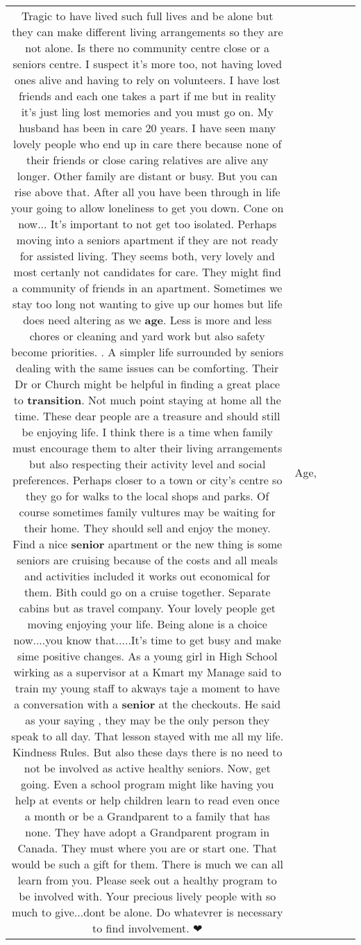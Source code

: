 \documentclass[11pt]{article}
\newlength\mylength
\begin{document}
\begin{center}
\begin{longtable}{|C{.65\mylength}|C{.30\mylength}|C{.12\mylength}|C{.12\mylength}|C{.12\mylength}|}
  \small Tragic to have  lived such full  lives and be alone but they can make different living arrangements so they are not alone.  Is there no community centre close or a seniors centre. I suspect it's  more too, not having loved ones alive and having to rely on volunteers. I have lost friends and each one  takes a part if me but in reality it's just ling lost  memories and you must go on. My husband has been in care 20 years. I have seen many lovely people who end up in care  there because none of their friends  or close caring relatives are alive any longer.  Other family are distant or busy.  But you can rise above that. After all you have been through in life your going to allow loneliness to get you down. Cone on now... It's important to not get too isolated. Perhaps moving into a seniors apartment if they are not ready for assisted living. They seems both, very lovely and most certanly not candidates for care. They might find a community of friends  in an apartment. Sometimes we stay too long not wanting to give up our homes but life does need altering as we \textbf{age}. Less is more and less chores or  cleaning and yard work but also safety become priorities. . A simpler life surrounded by seniors  dealing with the same issues can be comforting. Their Dr or  Church might be helpful in finding a great place to \textbf{transition}. Not much point staying at home all the time. These dear people are a treasure and should still be enjoying life. I think there is a time when family must encourage them to alter their  living arrangements but also respecting their activity level and social preferences. Perhaps closer to a town or city's centre so they go for walks to the local shops and parks.  Of course sometimes family vultures may be waiting for their home. They should sell and enjoy the money. Find a nice \textbf{senior} apartment or the new thing is  some seniors are cruising because of  the costs and all meals and activities included it works out economical for them. Bith could go on a cruise together. Separate cabins but as travel company. Your lovely people get moving enjoying your life.  Being alone is a choice now....you know that.....It's time to get busy and make sime positive changes. As a young girl in High School wirking as a supervisor at a Kmart my Manage said to train my young staff to akways taje a moment to have a conversation with a \textbf{senior} at the checkouts. He said as your saying , they may be the only person they speak to all day. That lesson stayed with me all my life. Kindness Rules. But also these days there is no need to not be involved as active healthy seniors. Now, get  going. Even a school program might like having you help at events or help children learn to read even once a month or be a Grandparent to a family that has none. They have adopt a Grandparent program in Canada. They must where you are or start one. That would be such a gift for them. There is much we can all learn from you. Please seek out a healthy program to be involved with. Your precious lively people with so much to give...dont be alone. Do whatevrer is necessary to  find involvement. ❤\normalsize   & Age, 
\end{longtable}
\end{center}
\end{document}
